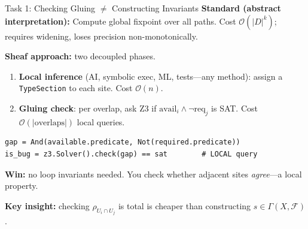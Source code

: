 \documentclass[aspectratio=169,10pt]{beamer}
\begin{document}
\begin{frame}[fragile]{Task 1: Checking Gluing $\neq$ Constructing Invariants}
\textbf{Standard (abstract interpretation):}
Compute global fixpoint over all paths.
Cost $\mathcal{O}(|D|^k)$; requires widening, loses precision non-monotonically.

\vspace{0.3em}
\textbf{Sheaf approach:} two decoupled phases.
\begin{enumerate}\small
  \item \textbf{Local inference} (AI, symbolic exec, ML, tests---any method):
        assign a \texttt{TypeSection} to each site. Cost $\mathcal{O}(n)$.
  \item \textbf{Gluing check}: per overlap, ask Z3 if
        $\text{avail}_i \land \lnot\text{req}_j$ is SAT.
        Cost $\mathcal{O}(|\text{overlaps}|)$ local queries.
\end{enumerate}

\begin{lstlisting}
gap = And(available.predicate, Not(required.predicate))
is_bug = z3.Solver().check(gap) == sat        # LOCAL query
\end{lstlisting}

\vspace{0.2em}
\textbf{Win:} no loop invariants needed. You check whether adjacent sites
\emph{agree}---a local property.

\textcolor{honest}{\textbf{Key insight:}} checking $\rho_{U_i \cap U_j}$ is total
is cheaper than constructing $s \in \Gamma(X, \mathcal{F})$.
\end{frame}
\end{document}
